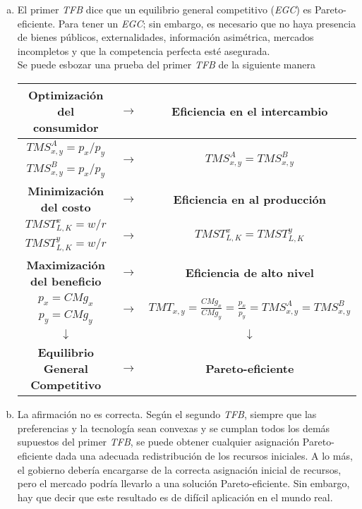 \begin{enumerate}[a)]
	\item El primer \emph{TFB} dice que un equilibrio general competitivo (\emph{EGC}) es Pareto-eficiente. Para tener un \emph{EGC}; sin embargo, es necesario que no haya presencia de bienes públicos, externalidades, información asimétrica, mercados incompletos y que la competencia perfecta esté asegurada.\\
	
		Se puede esbozar una prueba del primer \emph{TFB} de la siguiente manera
			\begin{center}
				\begingroup
					\setlength{\tabcolsep}{10pt} %
					\renewcommand{\arraystretch}{1.5} %
						\begin{tabular}{ccc}
							\hline
								\textbf{Optimización del consumidor} & $\rightarrow$ & \textbf{Eficiencia en el intercambio}\\
							\hline
								$TMS_{x,y}^A = p_x/p_y$ &\multirow{2}{*}{$\rightarrow$}	& \multirow{2}{*}{$TMS_{x,y}^A = TMS_{x,y}^B$}\\
								$TMS_{x,y}^B = p_x/p_y$	\\
							\hline
								\textbf{Minimización del costo} & $\rightarrow$ & \textbf{Eficiencia en al producción}\\
							\hline
								$TMST_{L,K}^x = w/r$ &\multirow{2}{*}{$\rightarrow$}	& \multirow{2}{*}{$TMST_{L,K}^x = TMST_{L,K}^y$}\\
								$TMST_{L,K}^y = w/r$ \\
							\hline
								\textbf{Maximización del beneficio} & $\rightarrow$ & \textbf{Eficiencia de alto nivel}\\
							\hline
								$p_x = CMg_x$ &\multirow{2}{*}{$\rightarrow$}	& \multirow{2}{*}{$TMT_{x,y} = \frac{CMg_x}{CMg_y} = \frac{p_x}{p_y}=TMS_{x,y}^A = TMS_{x,y}^B$}\\
								$p_y = CMg_y$\\
							\hline
								$\downarrow$ && $\downarrow$\\
							\hline
								\textbf{Equilibrio General Competitivo} & $\rightarrow$ & \textbf{Pareto-eficiente}\\
							\hline
						\end{tabular}
				\endgroup
			\end{center}
	\item La afirmación no es correcta. Según el segundo \emph{TFB}, siempre que las preferencias y la tecnología sean convexas y se cumplan todos los demás supuestos del primer \emph{TFB}, se puede obtener cualquier asignación Pareto-eficiente dada una adecuada redistribución de los recursos iniciales. A lo más, el gobierno debería encargarse de la correcta asignación inicial de recursos, pero el mercado podría llevarlo a una solución Pareto-eficiente. Sin embargo, hay que decir que este resultado es de difícil aplicación en el mundo real.
\end{enumerate}